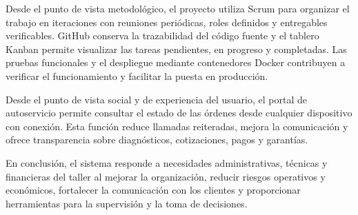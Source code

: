 Desde el punto de vista metodológico, el proyecto utiliza Scrum para organizar el trabajo en iteraciones con reuniones periódicas, roles definidos y entregables verificables. GitHub conserva la trazabilidad del código fuente y el tablero Kanban permite visualizar las tareas pendientes, en progreso y completadas. Las pruebas funcionales y el despliegue mediante contenedores Docker contribuyen a verificar el funcionamiento y facilitar la puesta en producción.

Desde el punto de vista social y de experiencia del usuario, el portal de autoservicio permite consultar el estado de las órdenes desde cualquier dispositivo con conexión. Esta función reduce llamadas reiteradas, mejora la comunicación y ofrece transparencia sobre diagnósticos, cotizaciones, pagos y garantías.

En conclusión, el sistema responde a necesidades administrativas, técnicas y financieras del taller al mejorar la organización, reducir riesgos operativos y económicos, fortalecer la comunicación con los clientes y proporcionar herramientas para la supervisión y la toma de decisiones.
